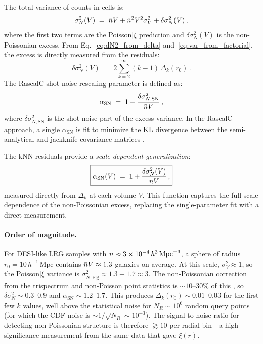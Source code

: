 The total variance of counts in cells is:
\begin{equation}
  \sigma_N^2(V) \;=\; \bar{n} V + \bar{n}^2 V^2 \sigma_V^2 + \delta\sigma^2_N(V)\,,
  \label{eq:total_variance}
\end{equation}
where the first two terms are the Poisson$|\xi$ prediction and $\delta\sigma^2_N(V)$ is the non-Poissonian excess.  From Eq.~\eqref{eq:dN2_from_delta} and~\eqref{eq:var_from_factorial}, the excess is directly measured from the residuals:
\begin{equation}
  \delta\sigma^2_N(V) \;=\; 2\sum_{k=2}^{\infty} (k-1)\,\Delta_k(r_0)\,.
  \label{eq:excess_var_from_delta}
\end{equation}
The RascalC shot-noise rescaling parameter \citep{Philcox2020,Rashkovetskyi2024} is defined as:
\begin{equation}
  \alpha_{\mathrm{SN}} \;=\; 1 + \frac{\delta\sigma^2_{N,\mathrm{SN}}}{\bar{n} V}\,,
  \label{eq:alpha_SN_def}
\end{equation}
where $\delta\sigma^2_{N,\mathrm{SN}}$ is the shot-noise part of the excess variance.  In the RascalC approach, a single $\alpha_{\mathrm{SN}}$ is fit to minimize the KL divergence between the semi-analytical and jackknife covariance matrices \citep{Rashkovetskyi2024}.

The kNN residuals provide a \emph{scale-dependent generalization}:
\begin{equation}
  \boxed{\alpha_{\mathrm{SN}}(V) \;=\; 1 + \frac{\delta\sigma^2_N(V)}{\bar{n} V}\,,}
  \label{eq:alpha_scale_dependent}
\end{equation}
measured directly from $\Delta_k$ at each volume $V$.  This function captures the full scale dependence of the non-Poissonian excess, replacing the single-parameter fit with a direct measurement.

\paragraph{Order of magnitude.}  For DESI-like LRG samples with $\bar{n} \approx 3 \times 10^{-4}\,h^3\,\mathrm{Mpc}^{-3}$, a sphere of radius $r_0 = 10\,h^{-1}\,\mathrm{Mpc}$ contains $\bar{n} V \approx 1.3$ galaxies on average.  At this scale, $\sigma_V^2 \approx 1$, so the Poisson$|\xi$ variance is $\sigma^2_{N,\mathrm{P}|\xi} \approx 1.3 + 1.7 \approx 3$.  The non-Poissonian correction from the trispectrum and non-Poisson point statistics is $\sim 10$--$30\%$ of this \citep{Rashkovetskyi2024}, so $\delta\sigma^2_N \sim 0.3$--$0.9$ and $\alpha_{\mathrm{SN}} \sim 1.2$--$1.7$.  This produces $\Delta_k(r_0) \sim 0.01$--$0.03$ for the first few $k$ values, well above the statistical noise for $N_R \sim 10^6$ random query points (for which the CDF noise is $\sim 1/\sqrt{N_R} \sim 10^{-3}$).  The signal-to-noise ratio for detecting non-Poissonian structure is therefore $\gtrsim 10$ per radial bin---a high-significance measurement from the same data that gave $\xi(r)$.

